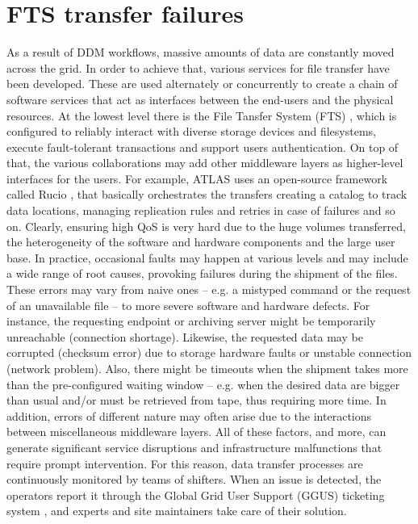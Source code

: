 \section{FTS transfer failures} \label{sec:FTS_failures}

As a result of DDM workflows, massive amounts of data are constantly moved across the grid.
In order to achieve that, various services for file transfer have been developed. These are used alternately or concurrently to create a chain of software services that act as interfaces between the end-users and the physical resources.
At the lowest level there is the File Tansfer System (FTS) \cite{karavakis2020fts}, which is configured to reliably interact with diverse storage devices and filesystems, execute fault-tolerant transactions and support users authentication.
On top of that, the various collaborations may add other middleware layers as higher-level interfaces for the users.
For example, ATLAS uses an open-source framework called Rucio \cite{barisits2019rucio}, that basically orchestrates the transfers creating a catalog to track data locations, managing replication rules and retries in case of failures and so on.
Clearly, ensuring high QoS is very hard due to the huge volumes transferred, the heterogeneity of the software and hardware components and the large user base.
In practice, occasional faults may happen at various levels and may include a wide range of root causes, provoking failures during the shipment of the files.
These errors may vary from naive ones -- e.g. a mistyped command or the request of an unavailable file -- to more severe software and hardware defects.
For instance, the requesting endpoint or archiving server might be temporarily unreachable (connection shortage).
Likewise, the requested data may be corrupted (checksum error) due to storage hardware faults or unstable connection (network problem).
Also, there might be timeouts when the shipment takes more than the pre-configured waiting window -- e.g. when the desired data are bigger than usual and/or must be retrieved from tape, thus requiring more time.
In addition, errors of different nature may often arise due to the interactions between miscellaneous middleware layers.
All of these factors, and more, can generate significant service disruptions and infrastructure malfunctions that require prompt intervention.
For this reason, data transfer processes are continuously monitored by teams of shifters. When an issue is detected, the operators report it through the Global Grid User Support (GGUS) ticketing system \cite{antoni2008ggus}, and experts and site maintainers take care of their solution.
